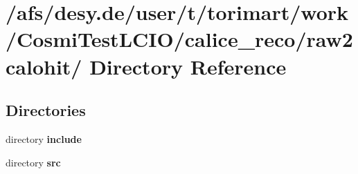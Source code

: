 \section{/afs/desy.de/user/t/torimart/work/CosmiTestLCIO/calice\_\-reco/raw2calohit/ Directory Reference}
\label{dir_8656c002b32f5afd83fbcb1fc9f618b8}
\subsection*{Directories}
\begin{DoxyCompactItemize}
\item 
directory {\bf include}
\item 
directory {\bf src}
\end{DoxyCompactItemize}

